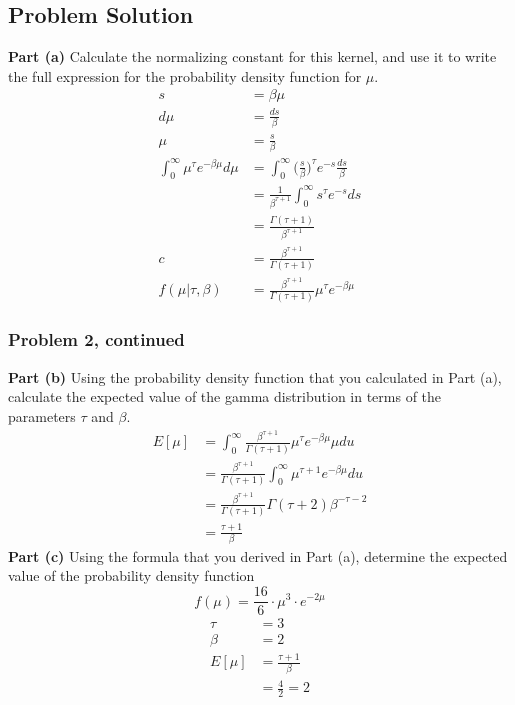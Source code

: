 \documentclass[12pt]{article}
\theoremstyle{definition}
\begin{document}
\subsection*{Problem Solution}

\noindent
{\bf Part (a)} Calculate the normalizing constant for this kernel, and use it to write the full expression for the probability density function for $\mu$.
\begin{align*}
s &= \beta\mu\\
d\mu &= \frac{ds}{\beta}\\
\mu &= \frac{s}{\beta}\\
\int_0^\infty \mu^\tau e^{-\beta\mu}d\mu &= \int_0^\infty \biggr(\frac{s}{\beta}\biggr)^\tau e^{-s}\frac{ds}{\beta}\\
&= \frac{1}{\beta^{\tau + 1}} \int_0^\infty s^\tau e^{-s}ds\\
&= \frac{\Gamma(\tau + 1)}{\beta^{\tau + 1}}\\
c &= \frac{\beta^{\tau + 1}}{\Gamma(\tau + 1)}\\
f(\mu|\tau, \beta) &= \frac{\beta^{\tau + 1}}{\Gamma(\tau + 1)} \mu^\tau e^{-\beta\mu}
\end{align*}
\newpage
\subsubsection*{Problem 2, continued}

\noindent
{\bf Part (b)} Using the probability density function that you calculated in Part (a), calculate the expected value of the gamma distribution in terms of the parameters $\tau$ and $\beta$.
\begin{align*}
E[\mu] &= \int_0^\infty \frac{\beta^{\tau + 1}}{\Gamma(\tau + 1)} \mu^\tau e^{-\beta\mu} \mu du\\
&= \frac{\beta^{\tau + 1}}{\Gamma(\tau + 1)} \int_0^\infty \mu^{\tau + 1} e^{-\beta\mu} du\\
&= \frac{\beta^{\tau + 1}}{\Gamma(\tau + 1)} \Gamma(\tau + 2)\beta^{-\tau - 2}\\
&= \frac{\tau + 1}{\beta}
\end{align*}
\noindent
{\bf Part (c)} Using the formula that you derived in Part (a), determine the expected value of the probability density function
$$
f(\mu) = \frac{16}{6} \cdot \mu^3 \cdot e^{-2\mu}
$$
\begin{align*}
\tau &= 3\\
\beta &= 2\\
E[\mu] &= \frac{\tau + 1}{\beta}\\
&= \frac{4}{2} = 2
\end{align*}
\end{document}
